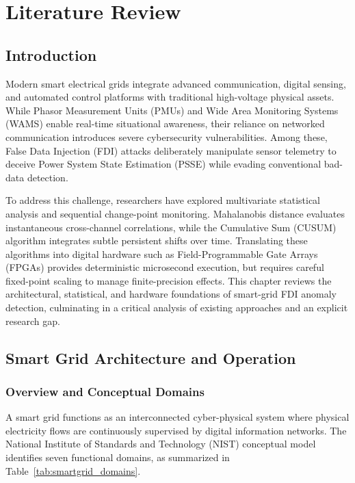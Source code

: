 \documentclass[11pt,a4paper]{report}
\begin{document}
\chapter{Literature Review}

\section{Introduction}
Modern smart electrical grids integrate advanced communication, digital sensing, and automated
control platforms with traditional high-voltage physical assets. While Phasor Measurement Units
(PMUs) and Wide Area Monitoring Systems (WAMS) enable real-time situational awareness, their
reliance on networked communication introduces severe cybersecurity vulnerabilities. Among these,
False Data Injection (FDI) attacks deliberately manipulate sensor telemetry to deceive Power
System State Estimation (PSSE) while evading conventional bad-data detection.

To address this challenge, researchers have explored multivariate statistical analysis and
sequential change-point monitoring. Mahalanobis distance evaluates instantaneous cross-channel
correlations, while the Cumulative Sum (CUSUM) algorithm integrates subtle persistent shifts over
time. Translating these algorithms into digital hardware such as Field-Programmable Gate Arrays
(FPGAs) provides deterministic microsecond execution, but requires careful fixed-point scaling
to manage finite-precision effects. This chapter reviews the architectural, statistical, and
hardware foundations of smart-grid FDI anomaly detection, culminating in a critical analysis of
existing approaches and an explicit research gap.

\section{Smart Grid Architecture and Operation}

\subsection{Overview and Conceptual Domains}
A smart grid functions as an interconnected cyber-physical system where physical electricity flows
are continuously supervised by digital information networks. The National Institute of Standards
and Technology (NIST) conceptual model \cite{nist2014framework} identifies seven functional domains,
as summarized in Table~\ref{tab:smartgrid_domains}.
\end{document}
